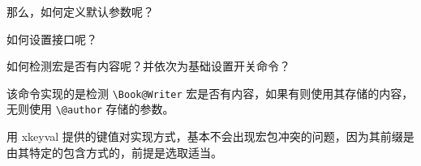   那么，如何定义默认参数呢？
\begin{texlist}
\end{texlist}

  如何设置接口呢？
\begin{texlist}
  \newcommand{\HTset}[1]{\setkeys{HTNotes.cls}{#1}}
\end{texlist}

  如何检测宏是否有内容呢？并依次为基础设置开关命令？
\begin{texlist}
  \ifdefempty{\Book@Writer}{\@author}{\Book@Writer}
\end{texlist}
  该命令实现的是检测 \verb|\Book@Writer| 宏是否有内容，如果有则使用其存储的内容，无则使用 \verb|\@author| 存储的参数。

  用 xkeyval 提供的键值对实现方式，基本不会出现宏包冲突的问题，因为其前缀是由其特定的包含方式的，前提是选取适当。
